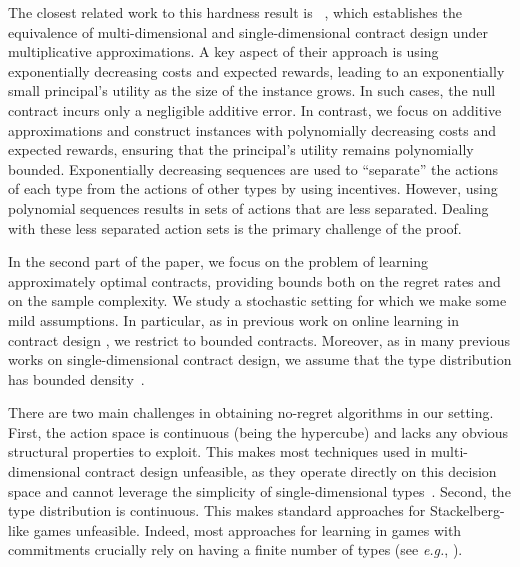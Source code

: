 The closest related work to this hardness result is~ \citet{castiglioni2025reduction}, which establishes the equivalence of multi-dimensional and single-dimensional contract design under multiplicative approximations. A key aspect of their approach is using exponentially decreasing costs and expected rewards, leading to an exponentially small principal's utility as the size of the instance grows. In such cases, the null contract incurs only a negligible additive error. 
%
In contrast, we focus on additive approximations and construct instances with polynomially decreasing costs and expected rewards, ensuring that the principal’s utility remains polynomially bounded. 
%
Exponentially decreasing sequences are used to ``separate'' the actions of each type from the actions of other types by using incentives. However, using polynomial sequences results in sets of actions that are less separated. Dealing with these less separated action sets is the primary challenge of the proof.



In the second part of the paper, we focus on the problem of learning approximately optimal contracts, providing bounds both on the regret rates and on the sample complexity.
%
We study a stochastic setting for which we make some mild assumptions. In particular, as in previous work on online learning in contract design \citep{zhu2022online}, we restrict to bounded contracts. Moreover, as in many previous works on single-dimensional contract design, we assume that the type distribution has bounded density~\citep{alon2021contracts,alon2023bayesian}.

There are two main challenges in obtaining no-regret algorithms in our setting.
First, the action space is continuous (being the hypercube) and lacks any obvious structural properties to exploit. This makes most techniques used in multi-dimensional contract design unfeasible, as they operate directly on this decision space and cannot leverage the simplicity of single-dimensional types~\cite{zhu2022online,bacchiocchi2023learning,ho2014adaptive}.
Second, the type distribution is continuous.
This makes standard approaches for Stackelberg-like games unfeasible. Indeed, most approaches for learning in games with commitments crucially rely on having a finite number of types  (see \emph{e.g.}, \citet{balcan2015commitment,castiglioni2020online}).

